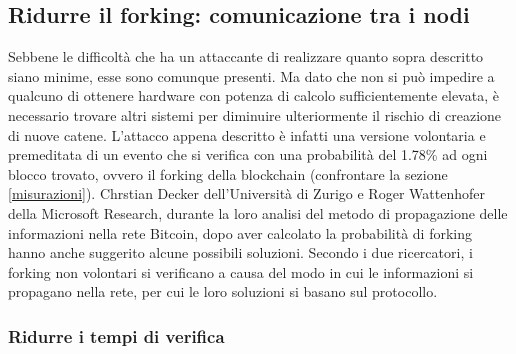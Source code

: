 \subsection{Ridurre il forking: comunicazione tra i nodi}

Sebbene le difficoltà che ha un attaccante di realizzare quanto sopra descritto siano minime, esse sono comunque presenti. Ma dato che non si può impedire a qualcuno di ottenere hardware con potenza di calcolo sufficientemente elevata, è necessario trovare altri sistemi per diminuire ulteriormente il rischio di creazione di nuove catene.
L'attacco appena descritto è infatti una versione volontaria e premeditata di un evento che si verifica con una probabilità del 1.78\% ad ogni blocco trovato, ovvero il forking della blockchain (confrontare la sezione \ref{misurazioni}). Chrstian Decker dell'Università di Zurigo e Roger Wattenhofer della Microsoft Research, durante la loro analisi del metodo di propagazione delle informazioni nella rete Bitcoin, dopo aver calcolato la probabilità di forking hanno anche suggerito alcune possibili soluzioni.
Secondo i due ricercatori, i forking non volontari si verificano a causa del modo in cui le informazioni si propagano nella rete, per cui le loro soluzioni si basano sul protocollo.

\subsubsection{Ridurre i tempi di verifica}

